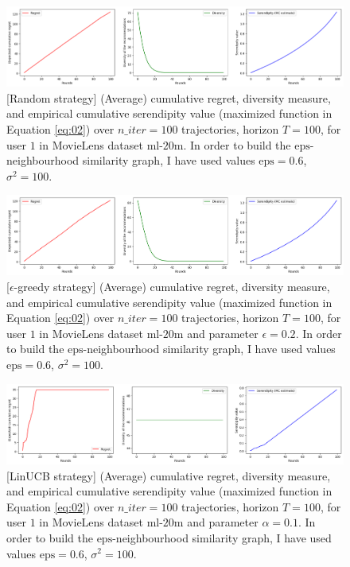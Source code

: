 \documentclass{article}
\begin{document}
\begin{figure}[H]
  \centering
  \includegraphics[scale=0.4]{../Results/ml-20m/random-48sec.png}
  \caption{[Random strategy] (Average) cumulative regret, diversity measure, and empirical cumulative serendipity value (maximized function in Equation \ref{eq:02}) over $n\_iter=100$ trajectories, horizon $T=100$, for user $1$ in MovieLens dataset $\text{ml-20m}$. In order to build the $\text{eps}$-neighbourhood similarity graph, I have used values $\text{eps}=0.6$, $\sigma^{2}=100$.}
\label{figrandom}
\end{figure}

\begin{figure}[H]
  \centering
  \includegraphics[scale=0.4]{../Results/ml-20m/greedy-2min16sec.png}
  \caption{[$\epsilon$-greedy strategy] (Average) cumulative regret, diversity measure, and empirical cumulative serendipity value (maximized function in Equation \ref{eq:02}) over $n\_iter=100$ trajectories, horizon $T=100$, for user $1$ in MovieLens dataset $\text{ml-20m}$ and parameter $\epsilon=0.2$. In order to build the $\text{eps}$-neighbourhood similarity graph, I have used values $\text{eps}=0.6$, $\sigma^{2}=100$.}
\label{figgreedy}
\end{figure}

\begin{figure}[H]
  \centering
  \includegraphics[scale=0.4]{../Results/ml-20m/linUCB-53sec.png}
  \caption{[LinUCB strategy] (Average) cumulative regret, diversity measure, and empirical cumulative serendipity value (maximized function in Equation \ref{eq:02}) over $n\_iter=100$ trajectories, horizon $T=100$, for user $1$ in MovieLens dataset $\text{ml-20m}$ and parameter $\alpha=0.1$. In order to build the $\text{eps}$-neighbourhood similarity graph, I have used values $\text{eps}=0.6$, $\sigma^{2}=100$.}
\label{figlinUCB}
\end{figure}
\end{document}
